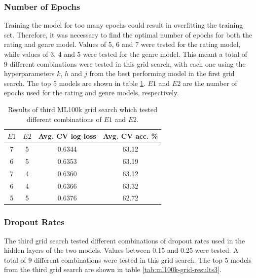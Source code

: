 \subsubsection{Number of Epochs}
Training the model for too many epochs could result in overfitting the training set. Therefore, it was necessary to find the optimal number of epochs for both the rating and genre model. Values of 5, 6 and 7 were tested for the rating model, while values of 3, 4 and 5 were tested for the genre model. This meant a total of 9 different combinations were tested in this grid search, with each one using the hyperparameters $k$, $h$ and $j$ from the best performing model in the first grid search. The top 5 models are shown in table \ref{tab:ml100k-grid-results2}. $E1$ and $E2$ are the number of epochs used for the rating and genre models, respectively.

\begin{table}[H]
\centering
\begin{tabular}{c | c | c | c}
\toprule
\textbf{$E1$} & \textbf{$E2$} & \textbf{Avg. CV log loss} & \textbf{Avg. CV acc.} \% \\
\midrule
7 & 5 & 0.6344 & 63.12 \\
\midrule
6 & 5 & 0.6353 & 63.19 \\
\midrule
7 & 4 & 0.6360 & 63.12 \\
\midrule
6 & 4 & 0.6366 & 63.32 \\
\midrule
5 & 5 & 0.6376 & 62.72 \\
\bottomrule
\end{tabular}
\caption[MovieLens 100k grid search results -- number of epochs]{Results of third ML100k grid search which tested  different combinations of $E1$ and $E2$.}
\label{tab:ml100k-grid-results2}
\end{table}

\subsubsection{Dropout Rates}
The third grid search tested different combinations of dropout rates used in the hidden layers of the two models. Values between 0.15 and 0.25 were tested. A total of 9 different combinations were tested in this grid search. The top 5 models from the third grid search are shown in table \ref{tab:ml100k-grid-results3}.

